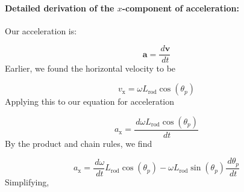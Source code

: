 \documentclass[12pt]{article}
\begin{document}
\paragraph{Detailed derivation of the $x$-component of acceleration:}
\label{GD:accelerationIXDeriv}
Our acceleration is:

\begin{displaymath}
\symbf{a}=\frac{\,d\symbf{v}}{\,dt}
\end{displaymath}
Earlier, we found the horizontal velocity to be

\begin{displaymath}
{v_{\text{x}}}=ω {L_{\text{rod}}} \cos\left({θ_{p}}\right)
\end{displaymath}
Applying this to our equation for acceleration

\begin{displaymath}
{a_{\text{x}}}=\frac{\,dω {L_{\text{rod}}} \cos\left({θ_{p}}\right)}{\,dt}
\end{displaymath}
By the product and chain rules, we find

\begin{displaymath}
{a_{\text{x}}}=\frac{\,dω}{\,dt} {L_{\text{rod}}} \cos\left({θ_{p}}\right)-ω {L_{\text{rod}}} \sin\left({θ_{p}}\right) \frac{\,d{θ_{p}}}{\,dt}
\end{displaymath}
Simplifying,
\end{document}
